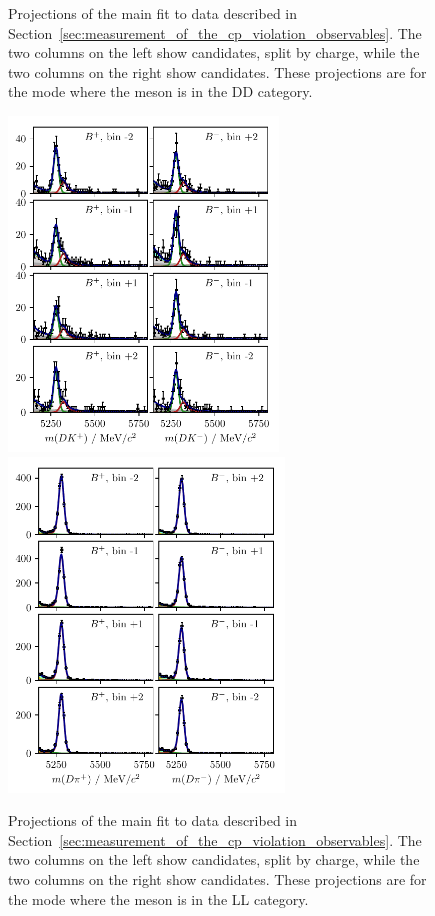 \begin{figure}[tp]
    \caption{Projections of the main fit to data described in Section~\ref{sec:measurement_of_the_cp_violation_observables}. The two columns on the left show \BtoDK candidates, split by charge, while the two columns on the right show \BtoDpi candidates. These projections are for the \DtoKspp mode where the \KS meson is in the DD category.}
    \label{fig:all_proj_DD_2}
\end{figure}

\begin{figure}[tp]
    \centering
    \includegraphics[height=3.5in]{figures/analysis/bin_by_bin/pretty_fit_bins_dk_LL_1_d2kskk.pdf}
    \includegraphics[height=3.5in]{figures/analysis/bin_by_bin/pretty_fit_bins_dpi_LL_1_d2kskk.pdf}
    \caption{Projections of the main fit to data described in Section~\ref{sec:measurement_of_the_cp_violation_observables}. The two columns on the left show \BtoDK candidates, split by charge, while the two columns on the right show \BtoDpi candidates. These projections are for the \DtoKskk mode where the \KS meson is in the LL category.}
    \label{fig:all_proj_LL_kskk}
\end{figure}

